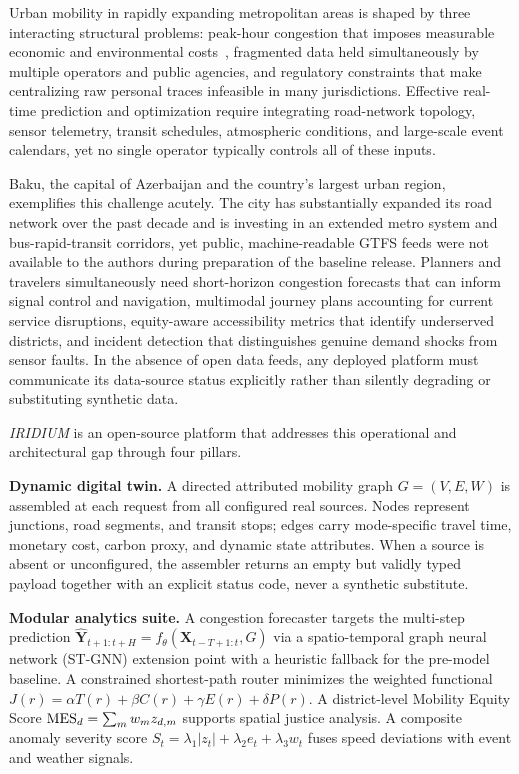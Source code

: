 
Urban mobility in rapidly expanding metropolitan areas is shaped by three
interacting structural problems: peak-hour congestion that imposes measurable
economic and environmental costs~\cite{schrank2019tti}, fragmented data
held simultaneously by multiple operators and public agencies, and
regulatory constraints that make centralizing raw personal traces infeasible
in many jurisdictions.
Effective real-time prediction and optimization require integrating
road-network topology, sensor telemetry, transit schedules, atmospheric
conditions, and large-scale event calendars, yet no single operator
typically controls all of these inputs.

Baku, the capital of Azerbaijan and the country's largest urban region,
exemplifies this challenge acutely.
The city has substantially expanded its road network over the past decade
and is investing in an extended metro system and bus-rapid-transit corridors,
yet public, machine-readable GTFS feeds were not available to the authors
during preparation of the baseline release.
Planners and travelers simultaneously need short-horizon congestion forecasts
that can inform signal control and navigation, multimodal journey plans
accounting for current service disruptions, equity-aware accessibility
metrics that identify underserved districts, and incident detection that
distinguishes genuine demand shocks from sensor faults.
In the absence of open data feeds, any deployed platform must communicate
its data-source status explicitly rather than silently degrading or
substituting synthetic data.

\textit{IRIDIUM} is an open-source platform that addresses this operational
and architectural gap through four pillars.

\noindent\textbf{Dynamic digital twin.}
A directed attributed mobility graph $G=(V,E,W)$ is assembled at each
request from all configured real sources.
Nodes represent junctions, road segments, and transit stops; edges carry
mode-specific travel time, monetary cost, carbon proxy, and dynamic state
attributes.
When a source is absent or unconfigured, the assembler returns an empty but
validly typed payload together with an explicit status code, never a
synthetic substitute.

\noindent\textbf{Modular analytics suite.}
A congestion forecaster targets the multi-step prediction
$\hat{\mathbf{Y}}_{t+1:t+H} = f_\theta(\mathbf{X}_{t-T+1:t}, G)$
via a spatio-temporal graph neural network (ST-GNN) extension point with a
heuristic fallback for the pre-model baseline.
A constrained shortest-path router minimizes the weighted functional
$J(r)=\alpha T(r)+\beta C(r)+\gamma E(r)+\delta P(r)$.
A district-level Mobility Equity Score $\mathrm{MES}_d=\sum_m w_m z_{d,m}$
supports spatial justice analysis.
A composite anomaly severity score
$S_t = \lambda_1|z_t|+\lambda_2 e_t+\lambda_3 w_t$ fuses speed deviations
with event and weather signals.

